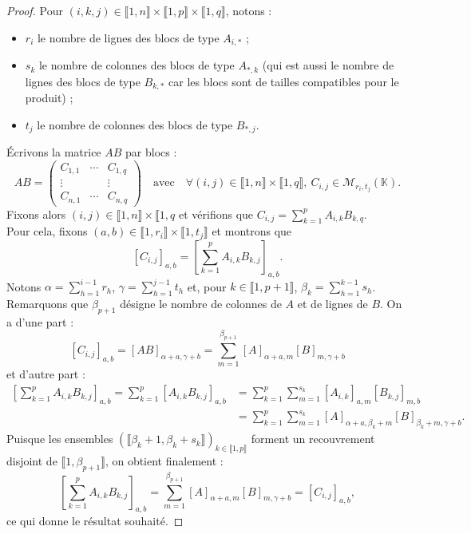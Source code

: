 \documentclass[french]{article}
\newcommand{\K}{\mathbb{K}}
\theoremstyle{plain}
\theoremstyle{definition}
\theoremstyle{remark}
\begin{document}
\begin{proof}
	Pour $(i,k,j)\in\llbracket1,n\rrbracket\times\llbracket1,p\rrbracket\times\llbracket1,q\rrbracket$, notons :
	\begin{itemize}
		\item $r_i$ le nombre de lignes des blocs de type $A_{i,*}$ ;
		\item $s_k$ le nombre de colonnes des blocs de type $A_{*,k}$ (qui est aussi le nombre de lignes des blocs de type $B_{k,*}$ car les blocs sont de tailles compatibles pour le produit) ;
		\item $t_j$ le nombre de colonnes des blocs de type $B_{*,j}$.
	\end{itemize}
	Écrivons la matrice $AB$ par blocs :
	$$AB=\begin{pmatrix}
		C_{1,1}&\cdots&C_{1,q}\\
		\vdots&&\vdots\\
		C_{n,1}&\cdots&C_{n,q}
	\end{pmatrix}\quad\text{avec}\quad\forall (i,j)\in\llbracket1,n\rrbracket\times\llbracket1,q\rrbracket,\ C_{i,j}\in\mathcal{M}_{r_i,t_j}(\K).$$
	Fixons alors $(i,j)\in\llbracket1,n\rrbracket\times\llbracket1,q$ et vérifions que $C_{i,j}=\displaystyle\sum_{k=1}^{p}A_{i,k}B_{k,q}$. \\
	Pour cela, fixons $(a,b)\in\llbracket1,r_i\rrbracket\times\llbracket1,t_j\rrbracket$ et montrons que 
	$$[C_{i,j}]_{a,b}=\left[\sum_{k=1}^{p}A_{i,k}B_{k,j}\right]_{a,b}.$$
	Notons $\alpha=\displaystyle\sum_{h=1}^{i-1}r_h$, $\gamma=\displaystyle\sum_{h=1}^{j-1}t_h$ et, pour $k\in\llbracket1,p+1\rrbracket$, $\beta_k=\displaystyle\sum_{h=1}^{k-1}s_h$. Remarquons que $\beta_{p+1}$ désigne le nombre de colonnes de $A$ et de lignes de $B$. On a d'une part :
	$$[C_{i,j}]_{a,b}=[AB]_{\alpha+a,\gamma+b}=\sum_{m=1}^{\beta_{p+1}}[A]_{\alpha+a,m}[B]_{m,\gamma+b}$$ et d'autre part :
	\begin{align*}
		\left[\sum_{k=1}^{p}A_{i,k}B_{k,j}\right]_{a,b}=\sum_{k=1}^{p}[A_{i,k}B_{k,j}]_{a,b}&=\sum_{k=1}^{p}\sum_{m=1}^{s_k}[A_{i,k}]_{a,m}[B_{k,j}]_{m,b}\\&=\sum_{k=1}^{p}\sum_{m=1}^{s_k}[A]_{\alpha+a,\beta_k+m}[B]_{\beta_k+m,\gamma+b}.
	\end{align*}
	Puisque les ensembles $(\llbracket\beta_k+1,\beta_k+s_k\rrbracket)_{k\in\llbracket1,p\rrbracket}$ forment un recouvrement disjoint de $\llbracket1,\beta_{p+1}\rrbracket$, on obtient finalement :
	$$\left[\sum_{k=1}^{p}A_{i,k}B_{k,j}\right]_{a,b}=\sum_{m=1}^{\beta_{p+1}}[A]_{\alpha+a,m}[B]_{m,\gamma+b}=[C_{i,j}]_{a,b},$$
	ce qui donne le résultat souhaité.
\end{proof}
\end{document}
